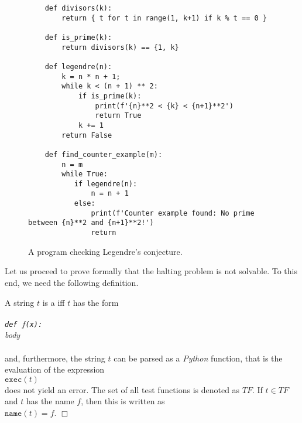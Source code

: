 \begin{figure}[!ht]
\centering
\begin{verbatim}
    def divisors(k):
        return { t for t in range(1, k+1) if k % t == 0 }

    def is_prime(k):
        return divisors(k) == {1, k}    
    
    def legendre(n):
        k = n * n + 1;
        while k < (n + 1) ** 2:
            if is_prime(k):
                print(f'{n}**2 < {k} < {n+1}**2')
                return True
            k += 1
        return False

    def find_counter_example(m):
        n = m
        while True:
           if legendre(n):
               n = n + 1
           else:
               print(f'Counter example found: No prime between {n}**2 and {n+1}**2!')
               return
\end{verbatim}
\vspace*{-0.3cm}
\caption{A program checking Legendre's conjecture.}
\label{fig:legendre.stlx}
\end{figure}

Let us proceed to prove formally that the halting problem is not solvable.  To this end, we need the
following definition.

\begin{Definition} 
A string $t$ is a  
iff $t$ has the form {\em\\[0.2cm]
\hspace*{1.3cm} \texttt{}         \\
\hspace*{1.3cm} \texttt{def $f$(x):} \\
\hspace*{1.8cm} \textsl{body}        \\
\hspace*{1.3cm} \texttt{}}         \\[0.2cm]
and, furthermore, the string $t$ can be parsed as a \textsl{Python} function, that is the evaluation of
the expression
\\[0.2cm]
\hspace*{1.3cm}
$\texttt{exec}(t)$
\\[0.2cm]
does not yield an error.  
The set of all test functions is denoted as $T\!F$.  If $t \in T\!F$ and $t$ has the name $f$, then
this is written as 
\\[0.2cm]
\hspace*{1.3cm}
$\mathtt{name}(t) = f$. \hspace*{\fill} $\Box$
\end{Definition}

